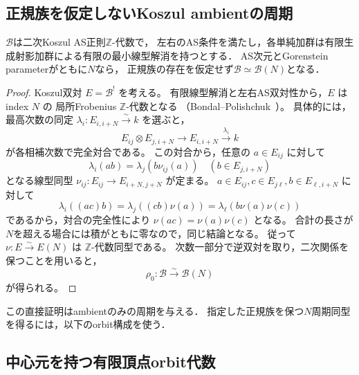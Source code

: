 \subsection{正規族を仮定しないKoszul ambientの周期}
\begin{lemma}
\label{lem:moduli-ambient-koszul-period}
$\mathcal B$は二次Koszul AS正則$\mathbb Z$-代数で，
左右のAS条件を満たし，各単純加群は有限生成射影加群による有限の最小線型解消を持つとする．
AS次元とGorenstein parameterがともに$N$なら，
正規族の存在を仮定せず$\mathcal B\simeq\mathcal B(N)$となる．
\end{lemma}
\begin{proof}
Koszul双対 $E=\mathcal B^!$ を考える。
有限線型解消と左右AS双対性から，$E$ はindex $N$ の
局所Frobenius $\mathbb Z$-代数となる
（Bondal--Polishchuk~\cite[Proposition~4.1, \S5]{PBondalPolishchukHelices}）。
具体的には，最高次数の同定
$\lambda_i:E_{i,i+N}\xrightarrow{\sim}k$ を選ぶと，
\begin{equation}
 E_{ij}\otimes E_{j,i+N}\longrightarrow E_{i,i+N}
 \xrightarrow{\lambda_i}k
\end{equation}
が各相補次数で完全対合である。
この対合から，任意の $a\in E_{ij}$ に対して
\begin{equation}
 \lambda_i(ab)=\lambda_j(b\nu_{ij}(a))
 \quad(b\in E_{j,i+N})
\end{equation}
となる線型同型 $\nu_{ij}:E_{ij}\to E_{i+N,j+N}$ が定まる。
$a\in E_{ij},c\in E_{j\ell},b\in E_{\ell,i+N}$ に対して
\begin{equation}
 \lambda_i((ac)b)
 =\lambda_j((cb)\nu(a))
 =\lambda_\ell(b\nu(a)\nu(c))
\end{equation}
であるから，対合の完全性により
$\nu(ac)=\nu(a)\nu(c)$ となる。
合計の長さが$N$を超える場合には積がともに零なので，同じ結論となる。
従って $\nu:E\xrightarrow{\sim}E(N)$ は $\mathbb Z$-代数同型である。
次数一部分で逆双対を取り，二次関係を保つことを用いると，
\begin{equation}\label{eq:moduli-ambient-rho-unmarked}
 \rho_0:\mathcal B\xrightarrow{\sim}\mathcal B(N)
\end{equation}
が得られる。
\end{proof}
この直接証明はambientのみの周期を与える．
指定した正規族を保つ$N$周期同型を得るには，以下のorbit構成を使う．

\subsection{中心元を持つ有限頂点orbit代数}

